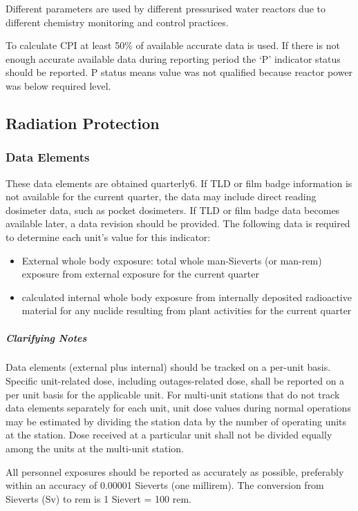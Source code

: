 Different parameters are used by different pressurised water reactors
due to different chemistry monitoring and control practices.

To calculate CPI at least 50\% of available accurate data is used. If there is not enough accurate available data during reporting period the ‘P’ indicator status should be reported. P status means value was not qualified because reactor power was below required level.

\subsection{Radiation Protection}
\subsubsection{Data Elements}

These data elements are obtained quarterly6. If TLD or film badge
information is not available for the current quarter, the data may
include direct reading dosimeter data, such as pocket dosimeters. If
TLD or film badge data becomes available later, a data revision should
be provided. The following data is required to determine each unit's
value for this indicator:
\begin{itemize}
\item External whole body exposure: total whole man-Sieverts (or man-rem) exposure from external exposure for the current quarter
\item calculated internal whole body exposure from internally
  deposited radioactive material for any nuclide resulting from plant
  activities for the current quarter
\end{itemize}

\subparagraph{Clarifying Notes}

Data elements (external plus internal) should be tracked on a per-unit
basis. Specific unit-related dose, including outages-related dose,
shall be reported on a per unit basis for the applicable unit. For
multi-unit stations that do not track data elements separately for
each unit, unit dose values during normal operations may be estimated
by dividing the station data by the number of operating units at the
station. Dose received at a particular unit shall not be divided
equally among the units at the multi-unit station.

All personnel exposures should be reported as accurately as possible,
preferably within an accuracy of 0.00001 Sieverts (one millirem). The conversion from Sieverts (Sv) to rem is 1 Sievert = 100 rem.

